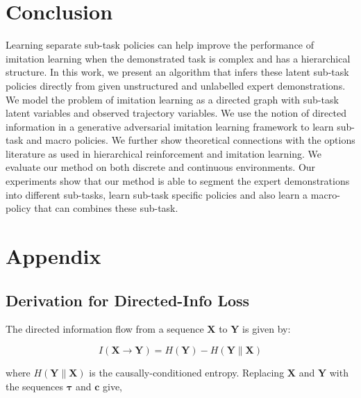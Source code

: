 \documentclass{article} %
\begin{document}
\section{Conclusion}
 Learning separate sub-task policies can help improve the performance of imitation learning when the demonstrated task is complex and has a hierarchical structure. In this work, we present an algorithm that infers these latent sub-task policies directly from given unstructured and unlabelled expert demonstrations. We model the problem of imitation learning as a directed graph with sub-task latent variables and observed trajectory variables. We use the notion of directed information in a generative adversarial imitation learning framework to learn sub-task and macro policies. We further show theoretical connections with the options literature as used in hierarchical reinforcement and imitation learning. We evaluate our method on both discrete and continuous environments. Our experiments show that our method is able to segment the expert demonstrations into different sub-tasks, learn sub-task specific policies and also learn a macro-policy that can combines these sub-task.




\clearpage

\appendix
\renewcommand{\thesection}{\Alph{section}}
\section{Appendix}

\subsection{Derivation for Directed-Info Loss}
\label{sec:derivation}
The directed information flow from a sequence $\boldsymbol{X}$ to $\boldsymbol{Y}$ is given by:

\begin{equation*}
I(\boldsymbol{X} \rightarrow \boldsymbol{Y}) = H(\boldsymbol{Y}) - H(\boldsymbol{Y} \| \boldsymbol{X})
\end{equation*}

where $H(\boldsymbol{Y} \| \boldsymbol{X})$ is the causally-conditioned entropy. Replacing $\boldsymbol{X}$ and $\boldsymbol{Y}$ with the sequences $\boldsymbol{\tau}$ and $\boldsymbol{c}$ give,
\end{document}
